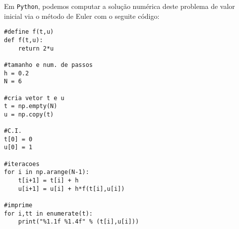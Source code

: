 \begin{ex}
\ifispython
Em \verb+Python+, podemos computar a solução numérica deste problema de valor inicial via o método de Euler com o seguite código:
\begin{verbatim}
#define f(t,u)
def f(t,u):
    return 2*u

#tamanho e num. de passos
h = 0.2
N = 6

#cria vetor t e u
t = np.empty(N)
u = np.copy(t)

#C.I.
t[0] = 0
u[0] = 1

#iteracoes
for i in np.arange(N-1):
    t[i+1] = t[i] + h
    u[i+1] = u[i] + h*f(t[i],u[i])

#imprime
for i,tt in enumerate(t):
    print("%1.1f %1.4f" % (t[i],u[i]))
\end{verbatim}
\fi
\end{ex}
